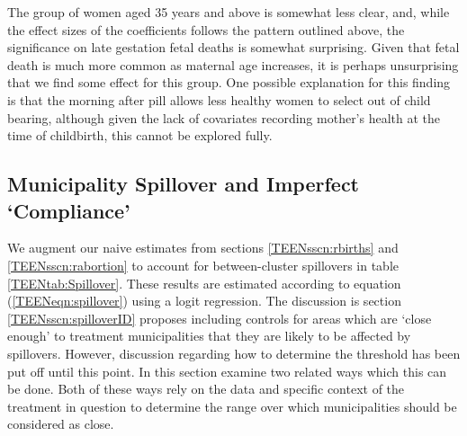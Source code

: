 The group of women aged 35 years and above is somewhat less clear, and, while the 
effect sizes of the coefficients follows the pattern outlined above, the
significance on late gestation fetal deaths is somewhat surprising.  Given that
fetal death is much more common as maternal age increases, it is perhaps 
unsurprising that we find some effect for this group.  One possible explanation
for this finding is that the morning after pill allows less healthy women to 
select out of child bearing, although given the lack of covariates recording 
mother's health at the time of childbirth, this cannot be explored fully.

\subsection{Municipality Spillover and Imperfect `Compliance'}
\label{TEENsscn:spillover}
We augment our naive estimates from sections \ref{TEENsscn:rbirths} and
\ref{TEENsscn:rabortion} to account for between-cluster spillovers in table
\ref{TEENtab:Spillover}.  These results are estimated according to equation
(\ref{TEENeqn:spillover}) using a logit regression.  The discussion is section
\ref{TEENsscn:spilloverID} proposes including controls for areas which are `close 
enough' to treatment municipalities that they are likely to be affected by
spillovers.  However, discussion regarding how to determine the threshold has
been put off until this point. In this section \person examine two related ways 
which this can be done.  Both of these ways rely on the data and specific context 
of the treatment in question to determine the range over which municipalities 
should be considered as close.

